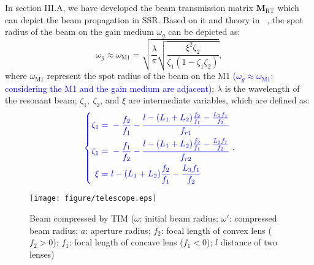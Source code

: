 \documentclass{IEEEtran}
\begin{document}
In section III.A, we have developed the beam transmission matrix $\mathbf{M}_\mathrm{RT}$ which can depict the beam propagation in SSR. 
Based on it and theory in ~\cite{Baues1969Huygens}, the spot radius of the beam on the gain medium $\omega_g$ can be depicted as:  
\begin{equation}\label{mode spot1}
\omega_g \approx \omega_\mathrm{M1}= \sqrt{\frac{\lambda}{\pi}\sqrt{\frac{\xi^2\zeta_2}{\zeta_1(1-\zeta_1\zeta_2)}}},
\end{equation}
where $\omega_\mathrm{M1}$ represent the spot radius of the beam on the M1 \textcolor{blue}{($\omega_g\approx\omega_\mathrm{M1}$: considering the M1 and the gain medium are adjacent)}; $\lambda$ is the wavelength of the resonant beam; $\zeta_1,~\zeta_2$, and $\xi$ are intermediate variables, which are defined as:
\begin{equation}
\textcolor{blue}{
\left\{
\begin{aligned}
\zeta_1=&~-\frac{f_2}{f_1}-\frac{l-(L_1+L_2)\frac{f_2}{f_1}-\frac{L_3f_1}{f_2}}{f_{r1}}\\
\zeta_1=&~-\frac{f_1}{f_2}-\frac{l-(L_1+L_2)\frac{f_2}{f_1}-\frac{L_3f_1}{f_2}}{f_{r2}}\\
\xi=&~l-(L_1+L_2)\frac{f_2}{f_1}-\frac{L_3f_1}{f_2}
\end{aligned} 
\right..
}
\end{equation}
\begin{figure}[t]
	\centering
	\texttt{[image: figure/telescope.eps]}
	\caption{Beam compressed by TIM ($\omega$: initial beam radius; $\omega'$: compressed beam radius; $a$: aperture radius; $f_2$: focal length of convex lens ($f_2>0$); $f_1$: focal length of concave lens ($f_1<0$); $l$ distance of two lenses)}
	\label{TS2}
\end{figure}
\end{document}
